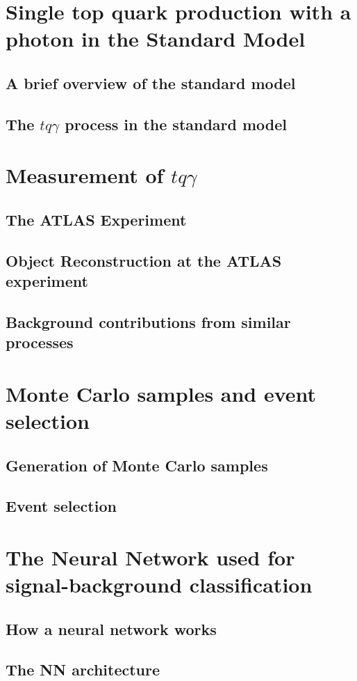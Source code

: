 \chapter{Single top quark production with a photon in the Standard Model}
\section{A brief overview of the standard model}
\section{The \texorpdfstring{$tq\gamma$}{TEXT} process in the standard model}
\chapter{Measurement of \texorpdfstring{$tq\gamma$}{TEXT}}
\section{The ATLAS Experiment}
\section{Object Reconstruction at the ATLAS experiment}
\section{Background contributions from similar processes}
\chapter{Monte Carlo samples and event selection}
\section{Generation of Monte Carlo samples}
\section{Event selection}
\chapter{The Neural Network used for signal-background classification}
\section{How a neural network works}
\section{The NN architecture}
